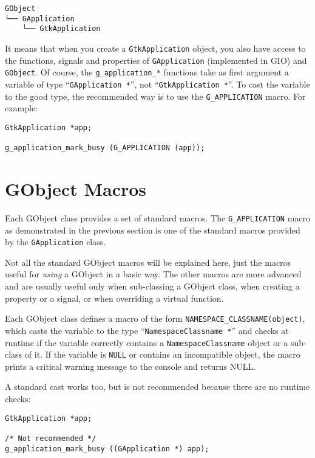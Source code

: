 \begin{verbatim}
GObject
└── GApplication
    └── GtkApplication
\end{verbatim}

It means that when you create a \lstinline{GtkApplication} object, you also have access to the functions, signals and properties of \lstinline{GApplication} (implemented in GIO) and \lstinline{GObject}. Of course, the \lstinline{g_application_*} functions take as first argument a variable of type ``\lstinline{GApplication *}'', not ``\lstinline{GtkApplication *}''. To cast the variable to the good type, the recommended way is to use the \lstinline{G_APPLICATION} macro. For example:

\begin{lstlisting}
GtkApplication *app;

g_application_mark_busy (G_APPLICATION (app));
\end{lstlisting}

\section{GObject Macros}

Each GObject class provides a set of standard macros. The \lstinline{G_APPLICATION} macro as demonstrated in the previous section is one of the standard macros provided by the \lstinline{GApplication} class.

Not all the standard GObject macros will be explained here, just the macros useful for \emph{using} a GObject in a basic way. The other macros are more advanced and are usually useful only when sub-classing a GObject class, when creating a property or a signal, or when overriding a virtual function.

Each GObject class defines a macro of the form \lstinline{NAMESPACE_CLASSNAME(object)}, which casts the variable to the type ``\lstinline{NamespaceClassname *}'' and checks at runtime if the variable correctly contains a \lstinline{NamespaceClassname} object or a sub-class of it. If the variable is \lstinline{NULL} or contains an incompatible object, the macro prints a critical warning message to the console and returns NULL.

A standard cast works too, but is not recommended because there are no runtime checks:
\begin{lstlisting}
GtkApplication *app;

/* Not recommended */
g_application_mark_busy ((GApplication *) app);
\end{lstlisting}

